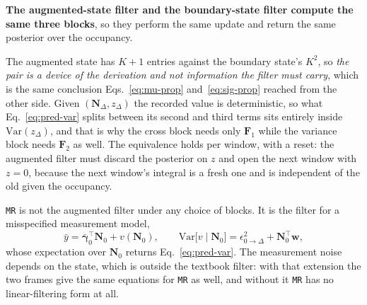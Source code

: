\begin{appendixbox}
\textbf{The augmented-state filter and the boundary-state filter compute the same three blocks},
so they perform the same update and return the same posterior over the occupancy.

The augmented state has $K+1$ entries against the boundary state's $K^2$, so \emph{the pair is a
device of the derivation and not information the filter must carry}, which is the same conclusion
Eqs.~\ref{eq:mu-prop} and~\ref{eq:sig-prop} reached from the other side. Given
$(\mathbf{N}_\Delta, z_\Delta)$ the recorded value is deterministic, so what
Eq.~\ref{eq:pred-var} splits between its second and third terms sits entirely inside
$\mathrm{Var}(z_\Delta)$, and that is why the cross block needs only $\mathbf{F}_1$ while the
variance block needs $\mathbf{F}_2$ as well. The equivalence holds per window, with a reset: the
augmented filter must discard the posterior on $z$ and open the next window with $z=0$, because
the next window's integral is a fresh one and is independent of the old given the occupancy.

\texttt{MR} is not the augmented filter under any choice of blocks. It is the filter for a
misspecified measurement model,
\begin{equation}
  \bar y = \bar{\boldsymbol{\gamma}}_0^\top\mathbf{N}_0 + v(\mathbf{N}_0),
  \qquad
  \mathrm{Var}\bigl[v\mid \mathbf{N}_0\bigr]=\epsilon^2_{0\to\Delta}+\mathbf{N}_0^\top\mathbf{w},
  \label{eq:mr-kf}
\end{equation}
whose expectation over $\mathbf{N}_0$ returns Eq.~\ref{eq:pred-var}. The measurement noise depends
on the state, which is outside the textbook filter: with that extension the two frames give the
same equations for \texttt{MR} as well, and without it \texttt{MR} has no linear-filtering form at
all.


\end{appendixbox}

